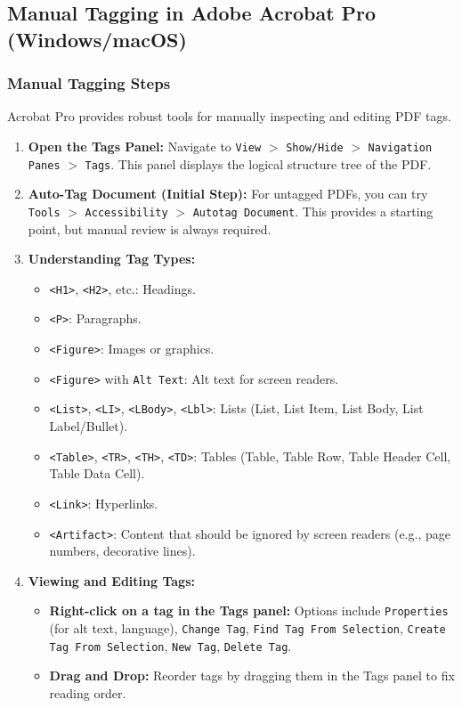 \subsection{Manual Tagging in Adobe Acrobat Pro (Windows/macOS)}
\label{subsec:manual-tagging-acrobat}

\subsubsection{Manual Tagging Steps}

Acrobat Pro provides robust tools for manually inspecting and editing PDF tags.

\begin{enumerate}
\item \textbf{Open the Tags Panel:} Navigate to \texttt{View} $>$ \texttt{Show/Hide} $>$ \texttt{Navigation Panes} $>$ \texttt{Tags}. This panel displays the logical structure tree of the PDF.

\item \textbf{Auto-Tag Document (Initial Step):} For untagged PDFs, you can try \texttt{Tools} $>$ \texttt{Accessibility} $>$ \texttt{Autotag Document}. This provides a starting point, but manual review is always required.

\item \textbf{Understanding Tag Types:}
    \begin{itemize}
    \item \texttt{<H1>}, \texttt{<H2>}, etc.: Headings.
    \item \texttt{<P>}: Paragraphs.
    \item \texttt{<Figure>}: Images or graphics.
    \item \texttt{<Figure>} with \texttt{Alt Text}: Alt text for screen readers.
    \item \texttt{<List>}, \texttt{<LI>}, \texttt{<LBody>}, \texttt{<Lbl>}: Lists (List, List Item, List Body, List Label/Bullet).
    \item \texttt{<Table>}, \texttt{<TR>}, \texttt{<TH>}, \texttt{<TD>}: Tables (Table, Table Row, Table Header Cell, Table Data Cell).
    \item \texttt{<Link>}: Hyperlinks.
    \item \texttt{<Artifact>}: Content that should be ignored by screen readers (e.g., page numbers, decorative lines).
    \end{itemize}

\item \textbf{Viewing and Editing Tags:}
    \begin{itemize}
    \item \textbf{Right-click on a tag in the Tags panel:} Options include \texttt{Properties} (for alt text, language), \texttt{Change Tag}, \texttt{Find Tag From Selection}, \texttt{Create Tag From Selection}, \texttt{New Tag}, \texttt{Delete Tag}.
    \item \textbf{Drag and Drop:} Reorder tags by dragging them in the Tags panel to fix reading order.
    \end{itemize}


\end{enumerate}
